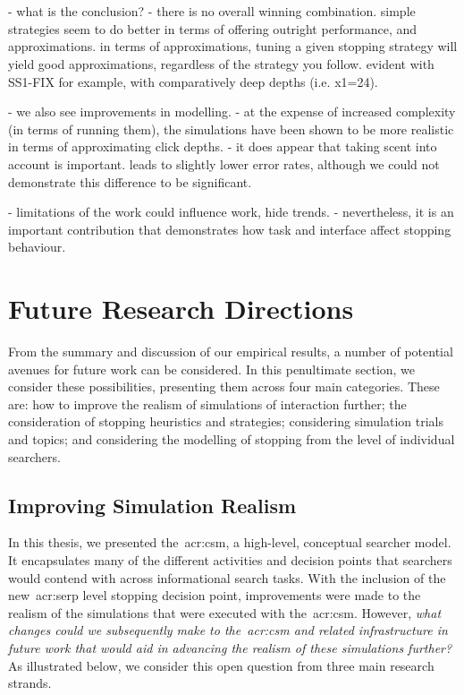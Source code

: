 \section{}\label{sec:conclusions:conclusion}










- what is the conclusion?
    - there is no overall winning combination. simple strategies seem to do better in terms of offering outright performance, and approximations. in terms of approximations, tuning a given stopping strategy will yield good approximations, regardless of the strategy you follow. evident with SS1-FIX for example, with comparatively deep depths (i.e. x1=24).

- we also see improvements in modelling.
- at the expense of increased complexity (in terms of running them), the simulations have been shown to be more realistic in terms of approximating click depths.
    - it does appear that taking scent into account is important. leads to slightly lower error rates, although we could not demonstrate this difference to be significant.

- limitations of the work could influence work, hide trends.
- nevertheless, it is an important contribution that demonstrates how task and interface affect stopping behaviour.

\section{Future Research Directions}\label{sec:conclusions:future}
From the summary and discussion of our empirical results, a number of potential avenues for future work can be considered. In this penultimate section, we consider these possibilities, presenting them across four main categories. These are: how to improve the realism of simulations of interaction further; the consideration of stopping heuristics and strategies; considering simulation trials and topics; and considering the modelling of stopping from the level of individual searchers.

\subsection{Improving Simulation Realism}\label{sec:conclusions:future:improving}
In this thesis, we presented the~\gls{acr:csm}, a high-level, conceptual searcher model. It encapsulates many of the different activities and decision points that searchers would contend with across informational search tasks. With the inclusion of the new~\gls{acr:serp} level stopping decision point, improvements were made to the realism of the simulations that were executed with the~\gls{acr:csm}. However, \emph{what changes could we subsequently make to the~\gls{acr:csm} and related infrastructure in future work that would aid in advancing the realism of these simulations further?} As illustrated below, we consider this open question from three main research strands.


